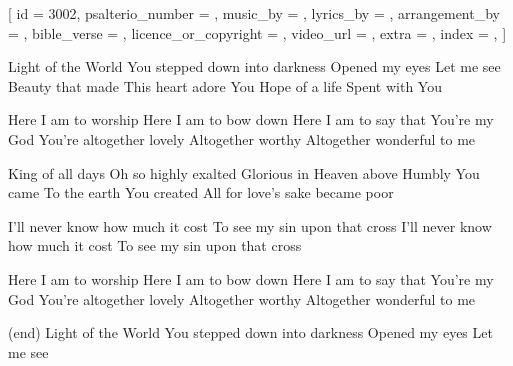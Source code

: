 
[
    id = {3002},
    psalterio_number = {},
    music_by = {},
    lyrics_by = {},
    arrangement_by = {},
    bible_verse = {},
    licence_or_copyright = {},
    video_url = {},
    extra = {},
    index = {},
]


\beginverse

Light of the World
You stepped down into darkness
Opened my eyes
Let me see
Beauty that made
This heart adore You
Hope of a life
Spent with You

\endverse


\beginchorus

Here I am to worship
Here I am to bow down
Here I am to say that You're my God
You're altogether lovely
Altogether worthy
Altogether wonderful to me

\endchorus


\beginverse

King of all days
Oh so highly exalted
Glorious in Heaven above
Humbly You came
To the earth You created
All for love's sake became poor

\endverse


\beginverse*

I'll never know how much it cost
To see my sin upon that cross
I'll never know how much it cost
To see my sin upon that cross \linebreak

\endverse*


\beginchorus

Here I am to worship
Here I am to bow down
Here I am to say that You're my God
You're altogether lovely
Altogether worthy
Altogether wonderful to me

\endchorus


\beginverse*

(end)
Light of the World
You stepped down into darkness
Opened my eyes
Let me see

\endverse*





\endsong
